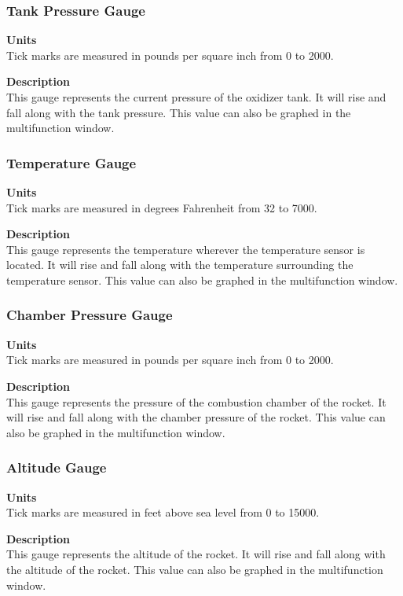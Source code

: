 \documentclass[10pt,draftclsnofoot,onecolumn,retainorgcmds]{IEEEtran}
\begin{document}
\subsubsection{Tank Pressure Gauge}
{\bf Units} \\ Tick marks are measured in pounds per square inch from 0 to 2000.\par
{\bf Description} \\ This gauge represents the current pressure of the oxidizer tank. It will rise and fall along with the tank pressure. This value can also be graphed in the multifunction window.\par

\subsubsection{Temperature Gauge}
{\bf Units} \\ Tick marks are measured in degrees Fahrenheit from 32 to 7000.\par
{\bf Description} \\ This gauge represents the temperature wherever the temperature sensor is located. It will rise and fall along with the temperature surrounding the temperature sensor. This value can also be graphed in the multifunction window. \par

\subsubsection{Chamber Pressure Gauge}
{\bf Units} \\ Tick marks are measured in pounds per square inch from 0 to 2000.\par
{\bf Description} \\ This gauge represents the pressure of the combustion chamber of the rocket. It will rise and fall along with the chamber pressure of the rocket. This value can also be graphed in the multifunction window. \par

\subsubsection{Altitude Gauge}
{\bf Units} \\ Tick marks are measured in feet above sea level from 0 to 15000.\par
{\bf Description} \\ This gauge represents the altitude of the rocket. It will rise and fall along with the altitude of the rocket. This value can also be graphed in the multifunction window. \par
\end{document}
